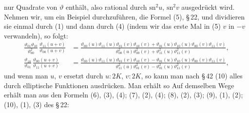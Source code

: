 nur Quadrate von $\vartheta$ enth\"alt, also rational durch $\mathrm{sn}^2 u$, $\mathrm{sn}^2 v$ ausgedr\"uckt wird. Nehmen wir, um ein Beispiel durchzuf\"uhren, die Formel (5), \S\,22, und dividieren sie einmal durch (1) und dann durch (4) (indem wir das erste Mal in (5) $v$ in $-v$ verwandeln), so folgt:
\begin{align*}
\frac{\vartheta_{01}\vartheta_{10}}{\vartheta_{00}^2}\,\frac{\vartheta_{11}(u+v)}{\vartheta_{00}(u+v)} &= \frac{\vartheta_{00}(u)\vartheta_{11}(u)\vartheta_{01}(v)\vartheta_{10}(v) + \vartheta_{01}(u)\vartheta_{10}(u)\vartheta_{00}(v)\vartheta_{11}(v)}{\vartheta_{00}^2(u)\vartheta_{00}^2(v) + \vartheta_{11}^2(u)\vartheta_{11}^2(v)},\\
\frac{\vartheta_{10}}{\vartheta_{01}}\,\frac{\vartheta_{00}(u+v)}{\vartheta_{11}(u+v)} &= \frac{\vartheta_{00}(u)\vartheta_{11}(u)\vartheta_{01}(v)\vartheta_{10}(v) - \vartheta_{01}(u)\vartheta_{10}(u)\vartheta_{00}(v)\vartheta_{11}(v)}{\vartheta_{11}^2(u)\vartheta_{01}^2(v) - \vartheta_{01}^2(u)\vartheta_{11}^2(v)},
\end{align*}
und wenn man $u$, $v$ ersetzt durch $u:2K$, $v:2K$, so kann man nach \S\,42 (10) alles durch elliptische Funktionen ausdr\"ucken. Man erh\"alt so
Auf demselben Wege erh\"alt man aus den Formeln (6), (3), (4); (7), (2), (4); (8), (2), (3); (9), (1), (2); (10), (1), (3) des \S\,22:

